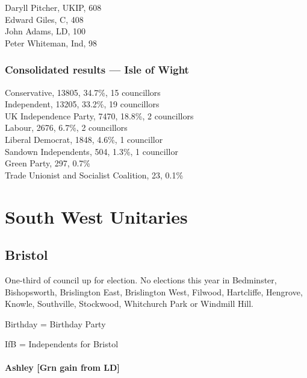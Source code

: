 \documentclass[a4paper,openany,10pt]{book}
\begin{document}


Daryll Pitcher, UKIP, 608\\
Edward Giles, C, 408\\
John Adams, LD, 100\\
Peter Whiteman, Ind, 98\\




\subsection*{Consolidated results --- Isle of Wight}
Conservative, 13805, 34.7\%, 15 councillors\\
Independent, 13205, 33.2\%, 19 councillors\\
UK Independence Party, 7470, 18.8\%, 2 councillors\\
Labour, 2676, 6.7\%, 2 councillors\\
Liberal Democrat, 1848, 4.6\%, 1 councillor\\
Sandown Independents, 504, 1.3\%, 1 councillor\\
Green Party, 297, 0.7\% \\
Trade Unionist and Socialist Coalition, 23, 0.1\% \\


\chapter{South West Unitaries}

\section{Bristol}

One-third of council up for election. No elections this year in Bedminster, Bishopsworth, Brislington East, Brislington West, Filwood, Hartcliffe, Hengrove, Knowle, Southville, Stockwood, Whitchurch Park or Windmill Hill.

Birthday = Birthday Party

IfB = Independents for Bristol



\subsubsection*{Ashley \hspace*{\fill}\nolinebreak[1]%
\enspace\hspace*{\fill}
[Grn gain from LD]}
\end{document}
